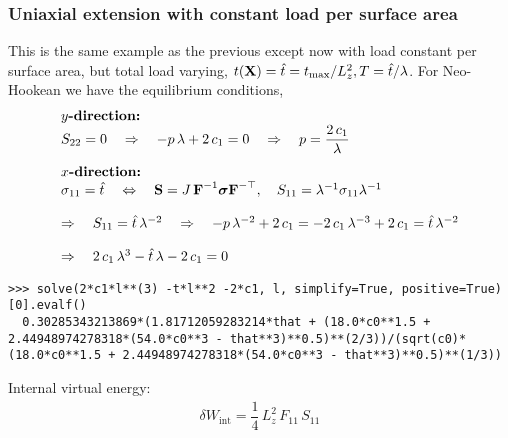 \subsubsection{Uniaxial extension with constant load per surface area}
This is the same example as the previous except now with load constant per surface area, but total load varying, ${t(\textbf{X}) = \hat{t} = t_\text{max}/L_z^2}, {T = \hat{t}/\lambda}$. For Neo-Hookean we have the equilibrium conditions,
\begin{equation*}
  \begin{array}{lll}
    \textbf{$y$-direction:}\\
    S_{22} = 0  \quad\Rightarrow\quad -p\,\lambda + 2\,c_1 = 0\quad\Rightarrow\quad p = \displaystyle\frac{\displaystyle{2\,c_1}}{\displaystyle{\lambda}}\,\\[4mm]
    \textbf{$x$-direction:}\\
    \sigma_{11} = \hat{t} \quad \Leftrightarrow \quad
    \textbf{S} = J\,\textbf{F}^{-1} \boldsymbol{\sigma} \textbf{F}^{-\top}, \quad S_{11} = \lambda^{-1} \sigma_{11} \lambda^{-1}\\[4mm]
    \Rightarrow \quad S_{11} = \hat{t} \, \lambda^{-2}
    \quad \Rightarrow \quad -p\,\lambda^{-2} + 2\,c_1 = -2\,c_1\,\lambda^{-3} + 2\,c_1 = \hat{t}\,\lambda^{-2}\\[4mm]
    \Rightarrow \quad 2\,c_1\,\lambda^3 - \hat{t}\,\lambda-2\,c_1  = 0
  \end{array}
\end{equation*}

\begin{lstlisting}[columns=fixed,basicstyle=\ttfamily]
  >>> solve(2*c1*l**(3) -t*l**2 -2*c1, l, simplify=True, positive=True)[0].evalf()
  0.30285343213869*(1.81712059283214*that + (18.0*c0**1.5 + 2.44948974278318*(54.0*c0**3 - that**3)**0.5)**(2/3))/(sqrt(c0)*(18.0*c0**1.5 + 2.44948974278318*(54.0*c0**3 - that**3)**0.5)**(1/3))
\end{lstlisting}

Internal virtual energy:
\begin{equation*}
  \begin{array}{lll}
    δW_\text{int} = \dfrac14 \,L_z^2 \,F_{11}\,S_{11}
  \end{array}
\end{equation*}

